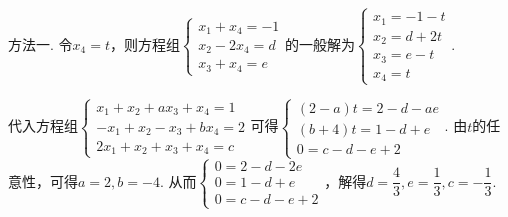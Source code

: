 \documentclass[UTF8,12pt,a4paper,fontset=fandol]{ctexart}
\begin{document}
\begin{solve}
方法一. 令$x_4=t$，则方程组$\begin{cases}
                x_1+x_4=-1 \\
                x_2-2x_4=d \\
                x_3+x_4=e
            \end{cases}$的一般解为$\begin{cases}
                x_1=-1-t \\
                x_2=d+2t \\
                x_3=e-t  \\
                x_4=t
            \end{cases}$.

        代入方程组$\begin{cases}
                x_1+x_2+ax_3+x_4=1  \\
                -x_1+x_2-x_3+bx_4=2 \\
                2x_1+x_2+x_3+x_4=c
            \end{cases}$可得$\begin{cases}
                (2-a)t=2-d-ae \\
                (b+4)t=1-d+e  \\
                0=c-d-e+2
            \end{cases}$. 由$t$的任意性，可得$a=2,b=-4$. 从而$\begin{cases}
                0=2-d-2e \\
                0=1-d+e  \\
                0=c-d-e+2
            \end{cases}$，解得$d=\dfrac{4}{3},e=\dfrac{1}{3},c=-\dfrac{1}{3}$.


\end{solve}
\end{document}
